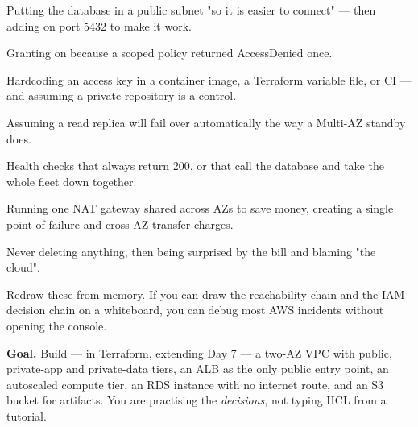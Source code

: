 \begin{mistakes}
\begin{wbitem}
  \item Putting the database in a public subnet "so it is easier to connect" --- then adding  on port 5432 to make it work.
  \item Granting  on \code{*} because a scoped policy returned AccessDenied once.
  \item Hardcoding an access key in a container image, a Terraform variable file, or CI --- and assuming a private repository is a control.
  \item Assuming a read replica will fail over automatically the way a Multi-AZ standby does.
  \item Health checks that always return 200, or that call the database and take the whole fleet down together.
  \item Running one NAT gateway shared across AZs to save money, creating a single point of failure and cross-AZ transfer charges.
  \item Never deleting anything, then being surprised by the bill and blaming "the cloud".
\end{wbitem}
\end{mistakes}


Redraw these from memory. If you can draw the reachability chain and the IAM decision chain on a whiteboard, you can debug most AWS incidents without opening the console.

\begin{writespace}
\end{writespace}

\begin{writespace}
\end{writespace}


\textbf{Goal.} Build --- in Terraform, extending Day 7 --- a two-AZ VPC with public, private-app and private-data tiers, an ALB as the only public entry point, an autoscaled compute tier, an RDS instance with no internet route, and an S3 bucket for artifacts. You are practising the \emph{decisions}, not typing HCL from a tutorial.

